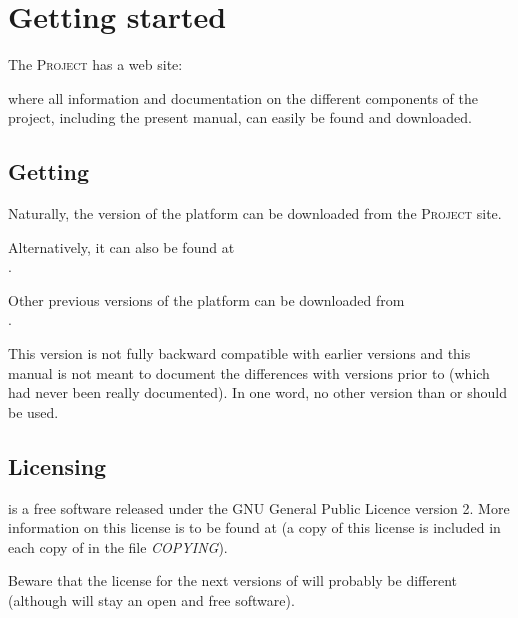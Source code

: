 \chapter{Getting started}

The \vcsn \textsc{Project}  has a web site:
\begin{center}
\end{center}
where all information and documentation on the different components 
of the project, including the present manual, can easily be found and 
downloaded.

\section{Getting \vcsnv}

Naturally, the version \VcsnVersion\xspace of the \vcsn platform can be downloaded
from the \vcsn \textsc{Project} site.

\medskip 
Alternatively, it can also be found at\\
\PushLine
{}.
\PushLine

Other previous versions of the \vcsn platform can be downloaded
from \\
\PushLine
{}.
\PushLine

\Cave
This version \VcsnVersion\xspace is not fully backward compatible 
with earlier versions and 
this manual is not meant to document the differences with
\vcsn versions prior to \VcsnVersion\xspace (which had never been really 
documented).
In one word, no other version than \vcsnv or \vcsn\VcsnVrsnOld\xspace should be used.



\section{Licensing}
\vcsnv is a free software released under the GNU General
Public Licence version 2. 
More information on this license is to be found at
 (a copy of
this license is included in each copy of \vcsn in the file
\emph{COPYING}).

Beware that the license for the next versions of \vcsn will
probably be different (although \vcsn will stay an open and free
software).

